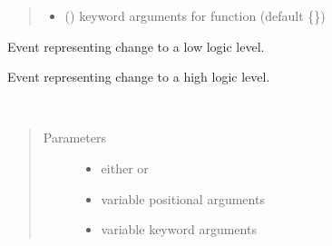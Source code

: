 \documentclass[letterpaper,10pt,english]{sphinxmanual}
\begin{document}
\begin{fulllineitems}
\begin{quote}
\begin{description}
\begin{itemize}
\item {} 
 () \textendash{} keyword arguments for function  (default \{\})

\end{itemize}

\end{description}\end{quote}

\begin{fulllineitems}
\label{\detokenize{index:rcpy.gpio.InputEvent.LOW}}
Event representing change to a low logic level.

\end{fulllineitems}


\begin{fulllineitems}
\label{\detokenize{index:rcpy.gpio.InputEvent.HIGH}}
Event representing change to a high logic level.

\end{fulllineitems}


\begin{fulllineitems}
\label{\detokenize{index:rcpy.gpio.InputEvent.action}}~\begin{quote}\begin{description}
\item[{Parameters}] \leavevmode\begin{itemize}
\item {} 
 \textendash{} either {\hyperref[\detokenize{index:rcpy.gpio.HIGH}]{}} or {\hyperref[\detokenize{index:rcpy.gpio.LOW}]{}}

\item {} 
 \textendash{} variable positional arguments

\item {} 
 \textendash{} variable keyword arguments

\end{itemize}


\end{description}
\end{quote}
\end{fulllineitems}
\end{fulllineitems}
\end{document}
